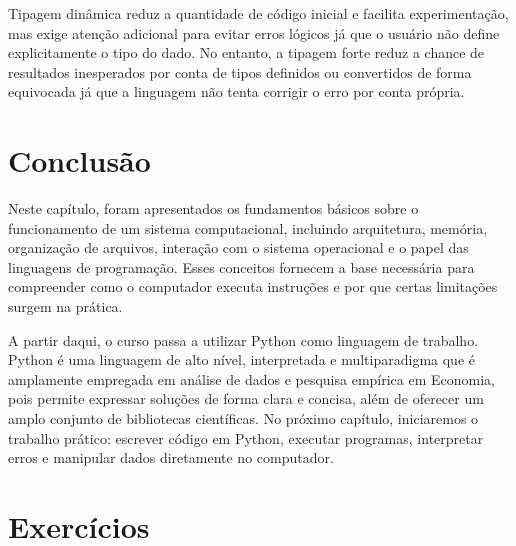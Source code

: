 \documentclass[
  brazilian,
  letterpaper,
  DIV=11,
  numbers=noendperiod]{scrreprt}
\begin{document}
Tipagem dinâmica reduz a quantidade de código inicial e facilita
experimentação, mas exige atenção adicional para evitar erros lógicos já
que o usuário não define explicitamente o tipo do dado. No entanto, a
tipagem forte reduz a chance de resultados inesperados por conta de
tipos definidos ou convertidos de forma equivocada já que a linguagem
não tenta corrigir o erro por conta própria.

\section{Conclusão}\label{conclusuxe3o}

Neste capítulo, foram apresentados os fundamentos básicos sobre o
funcionamento de um sistema computacional, incluindo arquitetura,
memória, organização de arquivos, interação com o sistema operacional e
o papel das linguagens de programação. Esses conceitos fornecem a base
necessária para compreender como o computador executa instruções e por
que certas limitações surgem na prática.

A partir daqui, o curso passa a utilizar Python como linguagem de
trabalho. Python é uma linguagem de alto nível, interpretada e
multiparadigma que é amplamente empregada em análise de dados e pesquisa
empírica em Economia, pois permite expressar soluções de forma clara e
concisa, além de oferecer um amplo conjunto de bibliotecas científicas.
No próximo capítulo, iniciaremos o trabalho prático: escrever código em
Python, executar programas, interpretar erros e manipular dados
diretamente no computador.

\section{Exercícios}\label{exercuxedcios}
\end{document}
